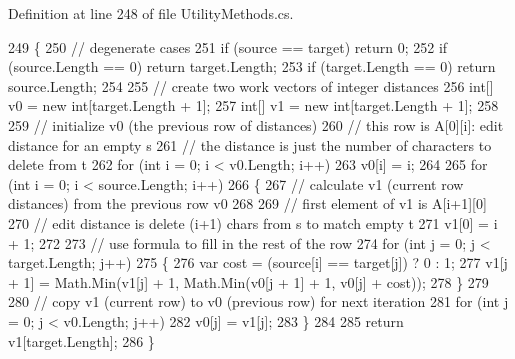 Definition at line 248 of file Utility\+Methods.\+cs.


\begin{DoxyCode}
249         \{
250             \textcolor{comment}{// degenerate cases}
251             \textcolor{keywordflow}{if} (source == target) \textcolor{keywordflow}{return} 0;
252             \textcolor{keywordflow}{if} (source.Length == 0) \textcolor{keywordflow}{return} target.Length;
253             \textcolor{keywordflow}{if} (target.Length == 0) \textcolor{keywordflow}{return} source.Length;
254 
255             \textcolor{comment}{// create two work vectors of integer distances}
256             \textcolor{keywordtype}{int}[] v0 = \textcolor{keyword}{new} \textcolor{keywordtype}{int}[target.Length + 1];
257             \textcolor{keywordtype}{int}[] v1 = \textcolor{keyword}{new} \textcolor{keywordtype}{int}[target.Length + 1];
258 
259             \textcolor{comment}{// initialize v0 (the previous row of distances)}
260             \textcolor{comment}{// this row is A[0][i]: edit distance for an empty s}
261             \textcolor{comment}{// the distance is just the number of characters to delete from t}
262             \textcolor{keywordflow}{for} (\textcolor{keywordtype}{int} i = 0; i < v0.Length; i++)
263                 v0[i] = i;
264 
265             \textcolor{keywordflow}{for} (\textcolor{keywordtype}{int} i = 0; i < source.Length; i++)
266             \{
267                 \textcolor{comment}{// calculate v1 (current row distances) from the previous row v0}
268 
269                 \textcolor{comment}{// first element of v1 is A[i+1][0]}
270                 \textcolor{comment}{//   edit distance is delete (i+1) chars from s to match empty t}
271                 v1[0] = i + 1;
272 
273                 \textcolor{comment}{// use formula to fill in the rest of the row}
274                 \textcolor{keywordflow}{for} (\textcolor{keywordtype}{int} j = 0; j < target.Length; j++)
275                 \{
276                     var cost = (source[i] == target[j]) ? 0 : 1;
277                     v1[j + 1] = Math.Min(v1[j] + 1, Math.Min(v0[j + 1] + 1, v0[j] + cost));
278                 \}
279 
280                 \textcolor{comment}{// copy v1 (current row) to v0 (previous row) for next iteration}
281                 \textcolor{keywordflow}{for} (\textcolor{keywordtype}{int} j = 0; j < v0.Length; j++)
282                     v0[j] = v1[j];
283             \}
284 
285             \textcolor{keywordflow}{return} v1[target.Length];
286         \}
\end{DoxyCode}
\mbox{\label{class_little_weeb_library_1_1_static_classes_1_1_utility_methods_a376120497e647e8c20d6a68c288db292}} 

